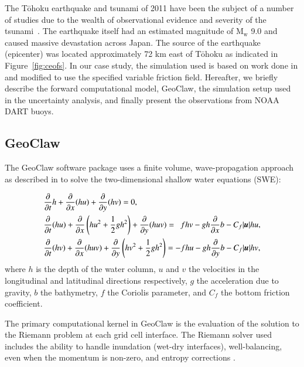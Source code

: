 \documentclass[review,12pt]{elsarticle}
\newcommand{\pard}[2]{\frac{\partial{#1}}{\partial{#2}}}
\renewcommand{\vec}[1]{{\mathchoice
                     {\mbox{\boldmath$\displaystyle{#1}$}}
                     {\mbox{\boldmath$\textstyle{#1}$}}
                     {\mbox{\boldmath$\scriptstyle{#1}$}}
                     {\mbox{\boldmath$\scriptscriptstyle{#1}$}}}}
\newcommand{\pd}{\pard}
\newcommand{\geoclaw}{{\sc GeoClaw}\xspace}
\newcommand{\tohoku}{T\={o}hoku\xspace}
\begin{document}
The \tohoku earthquake and tsunami of 2011 have been the subject of a number of
studies due to the wealth of observational evidence and severity of the tsunami~\cite{Kawase2014}.
The earthquake itself had an estimated magnitude of $\text{M}_\text{w}$ 9.0 and
caused massive devastation across Japan. The source of the earthquake (epicenter)
was located approximately 72 km east of \tohoku as indicated 
in Figure~\ref{fig:ceofs}. In our case study, the
simulation used is based on work done in \cite{MacInnes:2013cr} and modified to 
use the specified variable friction field. Hereafter, we briefly describe the
forward computational model, \geoclaw, the  simulation setup used in the
uncertainty analysis, and finally present the observations from NOAA DART buoys.


\subsection{\geoclaw} \label{ssub:geoclaw}
The \geoclaw software package uses a finite volume, wave-propagation approach as
described in \cite{LeVeque:1997eg} to solve the two-dimensional shallow water
equations (SWE):

\begin{equation} \label{eq:swe}
    \begin{aligned}
    &\pd{}{t} h + \pd{}{x} (hu) + \pd{}{y} (hv) = 0, \\
    &\pd{}{t}(hu) + \pd{}{x} \left(hu^2 + \frac{1}{2} g h^2 \right ) + \pd{}{y} (huv) = ~~ fhv - gh \pd{}{x} b - C_f |\vec{u}| hu, \\
    &\pd{}{t} (hv) + \pd{}{x} (huv) + \pd{}{y} \left (hv^2 + \frac{1}{2} gh^2 \right) = -fhu - gh \pd{}{y} b - C_f |\vec{u}| hv,
    \end{aligned}
\end{equation} 
where $h$ is the depth of the water column, $u$ and $v$ the velocities in the 
longitudinal and latitudinal directions respectively, $g$ the acceleration due 
to gravity, $b$ the bathymetry, $f$ the Coriolis parameter, and $C_f$ the bottom 
friction coefficient.  

The primary computational kernel in \geoclaw is the evaluation of the solution
to the Riemann problem at each grid cell interface.  The Riemann solver used
includes the ability to handle inundation (wet-dry interfaces), well-balancing,
even when the momentum is non-zero, and entropy corrections
\cite{George:2008aa}.
\end{document}
